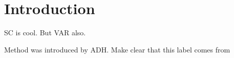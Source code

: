 \section{Introduction}
\ac{SC} is cool. But \ac{VAR} also. 

Method was introduced by \ac{ADH}. Make clear that this label comes from \cite{doudchenko:2016}
